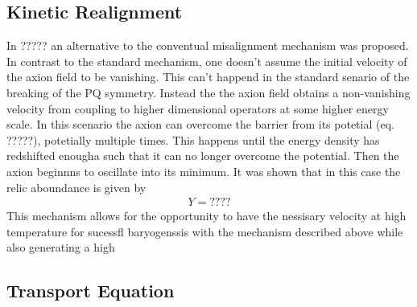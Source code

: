 \documentclass[13pt,a4paper,twoside,titlepage]{article}
\begin{document}


\subsection{Kinetic Realignment}
In ????? an alternative to the conventual misalignment mechanism was proposed.
In contrast to the standard mechanism, one doesn't assume the initial velocity of the axion field to be vanishing.
This can't happend in the standard senario of the breaking of the PQ symmetry.
Instead the the axion field obtains a non-vanishing velocity from coupling to higher
dimensional operators at some higher energy scale.
In this scenario the axion can overcome the barrier from its potetial (eq. ?????),
potetially multiple times.
This happens until the energy density has redshifted enougha such that it can no longer
overcome the potential. Then the axion beginnns to oscillate into its minimum.
It was shown that in this case the relic aboundance is given by
\begin{align}
    Y = ????
\end{align}
This mechanism allows for the opportunity to have the nessisary velocity at high temperature for sucessfl baryogenssis with the mechanism described above while also
generating a high

\subsection{Transport Equation}
\end{document}
